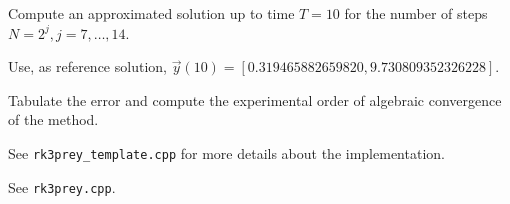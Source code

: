 \begin{problem}
\begin{subproblem}[3]
Compute an approximated solution up to time $T = 10$ for the number of steps $N = 2^j, j = 7, \dots, 14$.

Use, as reference solution, $\vec{y}(10) = \left[ 0.319465882659820, 9.730809352326228 \right]$.

Tabulate the error and compute the experimental order of algebraic convergence of the method.

\begin{hint}
 See \verb|rk3prey_template.cpp| for more details about the implementation.
\end{hint}

\cprotEnv \begin{solution} 
 See \verb|rk3prey.cpp|.
\end{solution}

\end{subproblem}

% 
% 



\end{problem}
